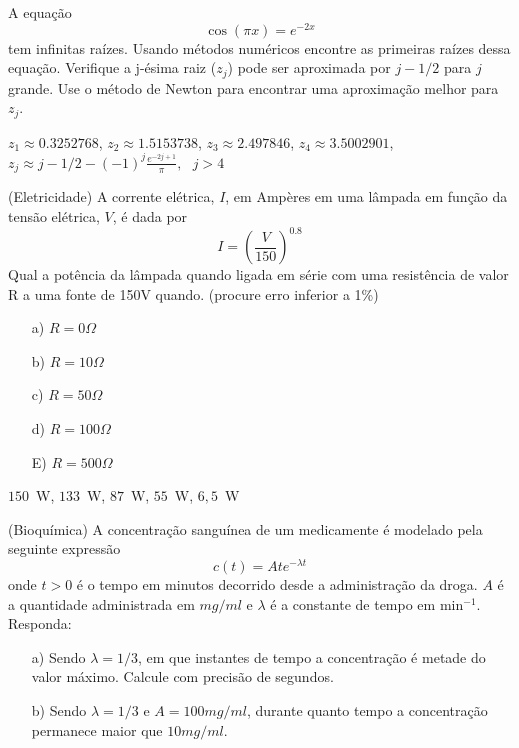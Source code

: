 \begin{exer} A equação $$\cos(\pi x)=e^{-2x}$$ tem infinitas raízes.
Usando  métodos numéricos encontre as primeiras raízes dessa equação. Verifique a j-ésima raiz ($z_j$) pode ser aproximada por $j-1/2$ para $j$ grande. Use o método de Newton para encontrar uma aproximação melhor para $z_j$.
\end{exer}
\begin{resp}
  
 $z_1\approx 0.3252768 $, $z_2\approx 1.5153738$, $z_3\approx 2.497846  $, $z_4\approx 3.5002901$, $z_j\approx j-1/2-(-1)^j\frac{e^{-2j+1}}{\pi}, ~~~j>4$    
  
\end{resp}


\begin{exer}(Eletricidade) A corrente elétrica, $I$, em Ampères em uma lâmpada em função da tensão elétrica, $V$, é dada por
$$I=\left(\frac{V}{150}\right)^{0.8}$$
Qual a potência da lâmpada quando ligada em série com uma resistência de valor R a uma fonte de 150V quando. (procure erro inferior a 1\%)
\begin{itemize}
\item [a)] $R=0\Omega$
\item [b)] $R=10\Omega$
\item [c)] $R=50\Omega$
\item [d)] $R=100\Omega$
\item [E)] $R=500\Omega$
\end{itemize}
\end{exer}
\begin{resp}
  
$150$~W, $133$~W, $87$~W, $55$~W, $6,5$~W    
  
\end{resp}




\begin{exer} (Bioquímica) A concentração sanguínea de um medicamente é modelado pela seguinte expressão
$$c(t)=Ate^{-\lambda t}$$
onde $t>0$ é o tempo em minutos decorrido desde a administração da droga. $A$ é a quantidade administrada em $mg/ml$ e $\lambda$ é a constante de tempo em min$^{-1}$.
Responda:
\begin{itemize}
\item[a)] Sendo $\lambda=1/3$, em que instantes de tempo a concentração é metade do valor máximo. Calcule com precisão de segundos.
\item[b)] Sendo $\lambda=1/3$ e $A=100mg/ml$, durante quanto tempo a concentração permanece maior que $10mg/ml$.
\end{itemize}
\end{exer}

